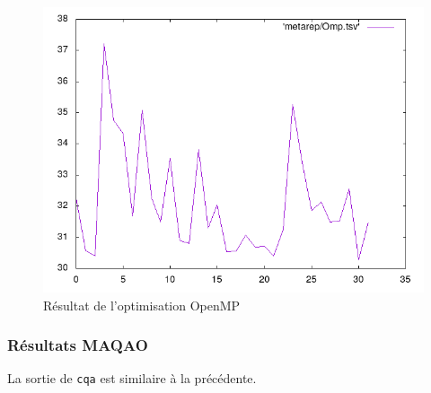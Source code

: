\documentclass{report}
\begin{document}
  \begin{figure}[ht!]
    \centering
    \includegraphics[scale=0.45]{../metarep/Omp.png}
    \caption{Résultat de l'optimisation OpenMP}
  \end{figure}
  \subsubsection{Résultats MAQAO}
  La sortie de \texttt{cqa} est similaire à la précédente.

\end{document}
